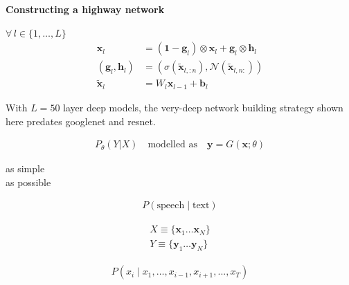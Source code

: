 \documentclass[12pt]{tiet-question-paper}
\begin{document}
{\newpage
\textbf{Constructing a highway network}

\(\forall\,l\in\{1,\ldots,L\}\)
\begin{align*}
  \mathbf{x}_{l} &= (\boldsymbol{1} - \mathbf{g}_l) \otimes
               \mathbf{x}_l + \mathbf{g}_l \otimes
               \mathbf{h}_l \\
  (\mathbf{g}_l,\mathbf{h}_l)
             &= \left(\sigma
               (\widetilde{\mathbf{x}}_{l,:n}),
               \mathcal{N}
               (\widetilde{\mathbf{x}}_{l,n:}) \right) \\
  \widetilde{\mathbf{x}}_l &= W_l\mathbf{x}_{l-1}+\mathbf{b}_l
\end{align*}

With \(L=50\) layer deep models, the very-deep network
building strategy shown here predates googlenet and
resnet.


\begin{align*}
P_\theta\left(Y|X\right)\quad\text{modelled as}\quad
  \mathbf{y} = G(\mathbf{x};\theta)
\end{align*}

as simple \\[0pt]
as possible

\begin{align*}
  P(\text{speech}\mid\text{text})
\end{align*}

\begin{align*}
  X\equiv\{\mathbf{x}_1\ldots\mathbf{x}_N\} \\
  Y\equiv\{\mathbf{y}_1\ldots\mathbf{y}_N\}
\end{align*}

\begin{align*}
P(x_i\mid x_1,…,x_{i-1},x_{i+1},...,x_T)
\end{align*}

}
\end{document}
